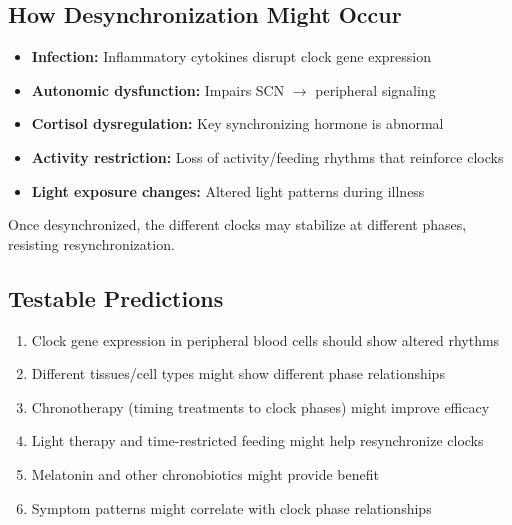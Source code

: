 \subsection{How Desynchronization Might Occur}

\begin{itemize}
    \item \textbf{Infection:} Inflammatory cytokines disrupt clock gene expression
    \item \textbf{Autonomic dysfunction:} Impairs SCN $\rightarrow$ peripheral signaling
    \item \textbf{Cortisol dysregulation:} Key synchronizing hormone is abnormal
    \item \textbf{Activity restriction:} Loss of activity/feeding rhythms that reinforce clocks
    \item \textbf{Light exposure changes:} Altered light patterns during illness
\end{itemize}

Once desynchronized, the different clocks may stabilize at different phases, resisting resynchronization.

\subsection{Testable Predictions}

\begin{enumerate}
    \item Clock gene expression in peripheral blood cells should show altered rhythms
    \item Different tissues/cell types might show different phase relationships
    \item Chronotherapy (timing treatments to clock phases) might improve efficacy
    \item Light therapy and time-restricted feeding might help resynchronize clocks
    \item Melatonin and other chronobiotics might provide benefit
    \item Symptom patterns might correlate with clock phase relationships
\end{enumerate}



